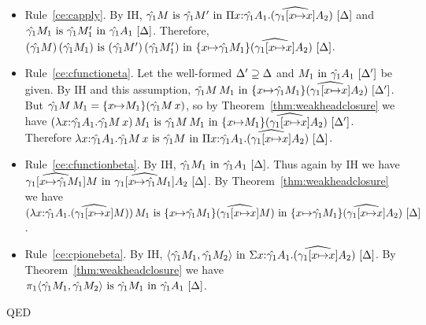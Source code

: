 \documentclass{article}
\theoremstyle{break}
\newcommand{\qed}{\mbox{QED}}
\newcommand{\env}{\gamma}
\newcommand{\envone}{\hat{\env_1}}
\newcommand{\envonex}{\widehat{\env_1[\cvar{\mapsto}\cvar]}}
\newenvironment{proof}{\noindent{\bf Proof:}\hspace*{0.5em}}{\hspace*{\fill}\qed}
\begin{document}
\begin{proof}
\begin{itemize}
\item Rule~\ref{ce:capply}.
By IH, 
$\semanticequivterm{\world}{\envone\constructor}{\envone\constructor'}
    {\kpi{\cvar}{\envone\kind_1}{(\envonex\kind_2)}}$ and
$\semanticequivterm{\world}{\envone\constructor_1}{\envone\constructor'_1}{\envone\kind_1}$.
Therefore,
$\semanticequivterm{\world}{\capply{(\envone\constructor)}{(\envone\constructor_1)}}
    {\capply{(\envone\constructor')}{(\envone\constructor'_1)}}
    {\substitute{\cvar}{\envone\constructor_1}{(\envonex\kind_2)}}$.

\item Rule~\ref{ce:cfunctioneta}.
Let the well-formed $\Delta'\supseteq\Delta$ and
$\semanticvalidterm{\world'}{\constructor_1}{\envone\kind_1}$ be given.
By IH and this assumption,
$\semanticvalidterm{\world'}{\capply{\envone\constructor}{\constructor_1}}
    {\substitute{\cvar}{\envone\constructor_1}{(\envonex\kind_2)}}$.
But
$\capply{\envone\constructor}{\constructor_1} = 
    \substitute{\cvar}{\constructor_1}{(\capply{\envone\constructor}{\cvar})}$,
so by Theorem~\ref{thm:weakheadclosure} we have
$\semanticequivterm{\world'}
   {\capply{(\cfunction{\cvar}{\envone\kind_1}{\capply{\envone\constructor}{\cvar}})}{\constructor_1}}
   {\capply{\envone\constructor}{\constructor_1}}
   {\substitute{\cvar}{\constructor_1}{(\envonex\kind_2)}}$.
Therefore
$\semanticequivterm{\world}{\cfunction{\cvar}{\envone\kind_1}{\capply{\envone\constructor}{\cvar}}}
   {\envone\constructor}
   {\kpi{\cvar}{\envone\kind_1}{(\envonex\kind_2)}}$.

\item Rule~\ref{ce:cfunctionbeta}.
By IH,
$\semanticvalidterm{\world}{\envone\constructor_1}{\envone\kind_1}$.
Thus again by IH we have
$\semanticvalidterm{\world}{\widehat{\env_1[\cvar{\mapsto}{\envone\constructor_1}]}\constructor}
   {\widehat{\env_1[\cvar{\mapsto}{\envone\constructor_1}]}\kind_2}$.
By Theorem~\ref{thm:weakheadclosure} we have
$\semanticequivterm{\world}
   {\capply{(\cfunction{\cvar}{\envone\kind_1}{(\envonex\constructor)})}{\constructor_1}}
   {\substitute{\cvar}{\envone\constructor_1}(\envonex\constructor)}
   {\substitute{\cvar}{\envone\constructor_1}{(\envonex\kind_2)}}$.

\item Rule~\ref{ce:cpionebeta}.
By IH,
$\semanticvalidterm{\world}{\cpair{\envone\constructor_1}{\envone\constructor_2}}
   {\ksigma{\cvar}{\envone\kind_1}{(\envonex\kind_2)}}$. 
By Theorem~\ref{thm:weakheadclosure} we have
$\semanticequivterm{\world}
  {\cpi{1}{\cpair{\envone\constructor_1}{\envone\constructor_2}}}
  {\envone\constructor_1}
  {\envone\kind_1}$.


\end{itemize}
\end{proof}
\end{document}
